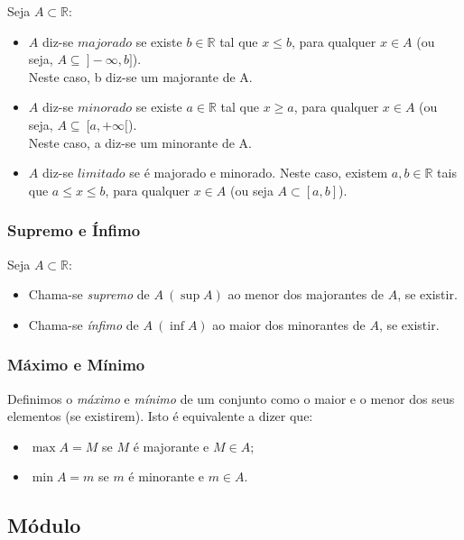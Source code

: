 \documentclass[11pt]{article}
\begin{document}
Seja $A \subset \mathbb{R}$:
\begin{itemize}[topsep=2pt, itemsep=2pt]
    \item $A$ diz-se $majorado$ se existe $b \in \mathbb{R}$ tal que $x \leq b$, para qualquer $x \in A$ (ou seja, $A \subseteq\ ]-\infty ,b]$). \\ Neste caso, b diz-se um majorante de A.
    \item $A$ diz-se $minorado$ se existe $a \in \mathbb{R}$ tal que $x \geq a$, para qualquer $x \in A$ (ou seja, $A \subseteq\ [a, +\infty[$). \\ Neste caso, a diz-se um minorante de A.
    \item $A$ diz-se $limitado$ se é majorado e minorado. Neste caso, existem $a, b \in \mathbb{R}$ tais que $a \leq x \leq b$, para qualquer $x \in A$ (ou seja $A \subset [a, b]$).
\end{itemize}

\subsubsection{Supremo e Ínfimo}

Seja $A \subset \mathbb{R}$:
\begin{itemize}[topsep=2pt, itemsep=2pt]
    \item Chama-se \textit{supremo} de $A\ (\sup A)$ ao menor dos majorantes de $A$, se existir.
    \item Chama-se \textit{ínfimo} de $A\ (\inf A)$ ao maior dos minorantes de $A$, se existir.
\end{itemize}

\subsubsection{Máximo e Mínimo}

Definimos o \textit{máximo} e \textit{mínimo} de um conjunto como o maior e o menor dos seus elementos (se existirem). Isto é equivalente a dizer que:
\begin{itemize}[topsep=2pt, itemsep=2pt]
    \item $\max A = M$ se $M$ é majorante e $M \in A$;
    \item $\min A = m$ se $m$ é minorante e $m \in A$.
\end{itemize}

\subsection{Módulo}
\end{document}
